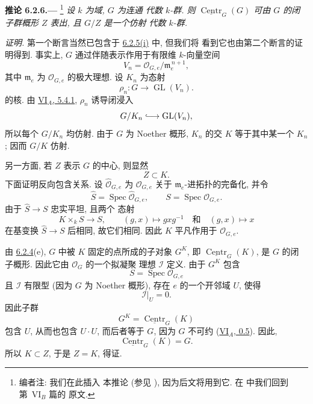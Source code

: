 
\medskip
{}\label{cor:sga3-VIB-6.2.6}%
\noindent\textbf{推论 6.2.6.---}%
\footnote{\label{note:sga3-VIB-59}编者注: 我们在此插入
本推论 (参见 ), 因为后文将用到它.
在  中我们回到第~VI\(_B\) 篇的
原文.}
\emph{设 \(k\) 为域, \(G\) 为连通
代数 \(k\)-群. 则
\(\underline{\operatorname{Centr}}_G(G)\) 可由
\(G\) 的闭子群概形 \(Z\) 表出, 且 \(G/Z\) 是一个仿射
代数 \(k\)-群.}

\emph{证明.}
第一个断言当然已包含于
\hyperref[cor:sga3-VIB-6.2.5]{6.2.5\textup{(i)}} 中, 但我们将
看到它也由第二个断言的证明得到.
事实上, \(G\) 通过伴随表示作用于有限维
\(k\)-向量空间
\[
  V_n=\mathcal O_{G,e}/\mathfrak m_e^{\,n+1},
\]
其中 \(\mathfrak m_e\) 为
\(\mathcal O_{G,e}\) 的极大理想. 设 \(K_n\) 为态射
\[
  \rho_n:G\longrightarrow\operatorname{GL}(V_n).
\]
的核. 由 \hyperref[prop:sga3-VIA-5.4.1]{VI\(_A\), 5.4.1},
\(\rho_n\) 诱导闭浸入
\[
  G/K_n\lhook\joinrel\longrightarrow\operatorname{GL}(V_n),
\]
所以每个 \(G/K_n\) 均仿射. 由于 \(G\) 为 Noether 概形,
\(K_n\) 的交 \(K\) 等于其中某一个 \(K_n\);
因而 \(G/K\) 仿射.

另一方面, 若 \(Z\) 表示 \(G\) 的中心, 则显然
\[
  Z\subset K.
\]
下面证明反向包含关系. 设
\(\widehat{\mathcal O}_{G,e}\) 为
\(\mathcal O_{G,e}\) 关于 \(\mathfrak m_e\)-进拓扑的完备化,
并令
\[
  \widehat S=\operatorname{Spec}\widehat{\mathcal O}_{G,e},
  \qquad
  S=\operatorname{Spec}\mathcal O_{G,e}.
\]
由于 \(\widehat S\to S\) 忠实平坦, 且两个
态射
\[
  K\times_k S\longrightarrow S,
  \qquad
  (g,x)\longmapsto gxg^{-1}
  \quad\text{和}\quad
  (g,x)\longmapsto x
\]
在基变换 \(\widehat S\to S\) 后相同,
故它们相同. 因此 \(K\) 平凡作用于 \(\mathcal O_{G,e}\).

由 \hyperref[ex:sga3-VIB-6.2.4-e]{6.2.4}\textup{(e)}, \(G\) 中被 \(K\)
固定的点所成的子对象 \(G^K\), 即
\(\underline{\operatorname{Centr}}_G(K)\), 是 \(G\) 的闭
子概形. 因此它由 \(\mathcal O_G\) 的一个拟凝聚
理想 \(\mathcal I\) 定义. 由于 \(G^K\) 包含
\[
  S=\operatorname{Spec}\mathcal O_{G,e}
\]
且 \(\mathcal I\) 有限型 (因为 \(G\) 为 Noether
概形), 存在 \(e\) 的一个开邻域 \(U\), 使得
\[
  \mathcal I|_U=0.
\]
因此子群
\[
  G^K=\underline{\operatorname{Centr}}_G(K)
\]
包含 \(U\), 从而也包含 \(U\cdot U\), 而后者等于
\(G\), 因为 \(G\) 不可约
(\hyperref[sga3:VIA:0.5]{VI\(_A\), 0.5}). 因此,
\[
  \underline{\operatorname{Centr}}_G(K)=G.
\]
所以 \(K\subset Z\), 于是 \(Z=K\), 得证.


